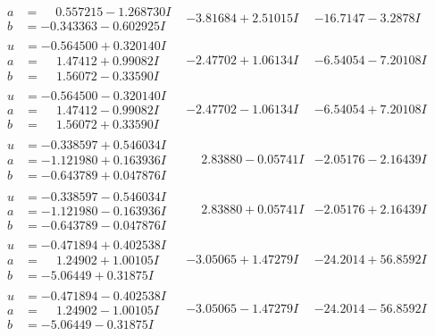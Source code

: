 \documentclass[1p]{elsarticle_modified}
\theoremstyle{definition}
\begin{document}
$$\begin{array}{c|c|c}
\begin{aligned}
a &= \phantom{-}0.557215 - 1.268730 I \\
b &= -0.343363 - 0.602925 I\end{aligned}
 & -3.81684 + 2.51015 I & -16.7147 - 3.2878 I \\ \hline\begin{aligned}
u &= -0.564500 + 0.320140 I \\
a &= \phantom{-}1.47412 + 0.99082 I \\
b &= \phantom{-}1.56072 - 0.33590 I\end{aligned}
 & -2.47702 + 1.06134 I & -6.54054 - 7.20108 I \\ \hline\begin{aligned}
u &= -0.564500 - 0.320140 I \\
a &= \phantom{-}1.47412 - 0.99082 I \\
b &= \phantom{-}1.56072 + 0.33590 I\end{aligned}
 & -2.47702 - 1.06134 I & -6.54054 + 7.20108 I \\ \hline\begin{aligned}
u &= -0.338597 + 0.546034 I \\
a &= -1.121980 + 0.163936 I \\
b &= -0.643789 + 0.047876 I\end{aligned}
 & \phantom{-}2.83880 - 0.05741 I & -2.05176 - 2.16439 I \\ \hline\begin{aligned}
u &= -0.338597 - 0.546034 I \\
a &= -1.121980 - 0.163936 I \\
b &= -0.643789 - 0.047876 I\end{aligned}
 & \phantom{-}2.83880 + 0.05741 I & -2.05176 + 2.16439 I \\ \hline\begin{aligned}
u &= -0.471894 + 0.402538 I \\
a &= \phantom{-}1.24902 + 1.00105 I \\
b &= -5.06449 + 0.31875 I\end{aligned}
 & -3.05065 + 1.47279 I & -24.2014 + 56.8592 I \\ \hline\begin{aligned}
u &= -0.471894 - 0.402538 I \\
a &= \phantom{-}1.24902 - 1.00105 I \\
b &= -5.06449 - 0.31875 I\end{aligned}
 & -3.05065 - 1.47279 I & -24.2014 - 56.8592 I \\ \hline\begin{aligned}

\end{aligned}
\end{array}$$
\end{document}
